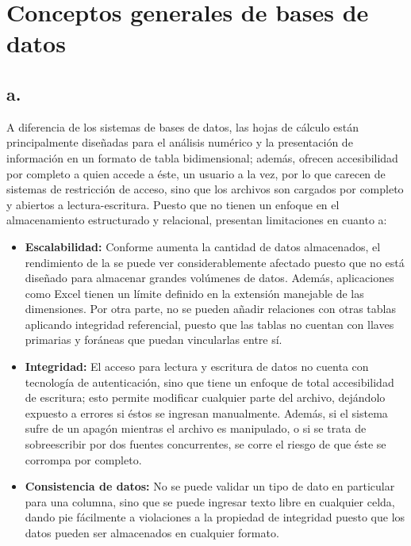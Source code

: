 \section{Conceptos generales de bases de datos}

\subsection*{a.}



A diferencia de los sistemas de bases de datos, las hojas de cálculo están principalmente diseñadas para el análisis numérico y la presentación de información en un formato de tabla bidimensional; además, ofrecen accesibilidad por completo a quien accede a éste, un usuario a la vez, por lo que carecen de sistemas de restricción de acceso, sino que los archivos son cargados por completo y abiertos a lectura-escritura. Puesto que no tienen un enfoque en el almacenamiento estructurado y relacional, presentan limitaciones en cuanto a:
\begin{itemize}
    \item \textbf{Escalabilidad:} Conforme aumenta la cantidad de datos almacenados, el rendimiento de la se puede ver considerablemente afectado puesto que no está diseñado para almacenar grandes volúmenes de datos. Además, aplicaciones como Excel tienen un límite definido en la extensión manejable de las dimensiones. Por otra parte, no se pueden añadir relaciones con otras tablas aplicando integridad referencial, puesto que las tablas no cuentan con llaves primarias y foráneas que puedan vincularlas entre sí.
    \item \textbf{Integridad:} El acceso para lectura y escritura de datos no cuenta con tecnología de autenticación, sino que tiene un enfoque de total accesibilidad de escritura; esto permite modificar cualquier parte del archivo, dejándolo expuesto a errores si éstos se ingresan manualmente. Además, si el sistema sufre de un apagón mientras el archivo es manipulado, o si se trata de sobreescribir por dos fuentes concurrentes, se corre el riesgo de que éste se corrompa por completo.
    \item \textbf{Consistencia de datos:} No se puede validar un tipo de dato en particular para una columna, sino que se puede ingresar texto libre en cualquier celda, dando pie fácilmente a violaciones a la propiedad de integridad puesto que los datos pueden ser almacenados en cualquier formato.
\end{itemize}

